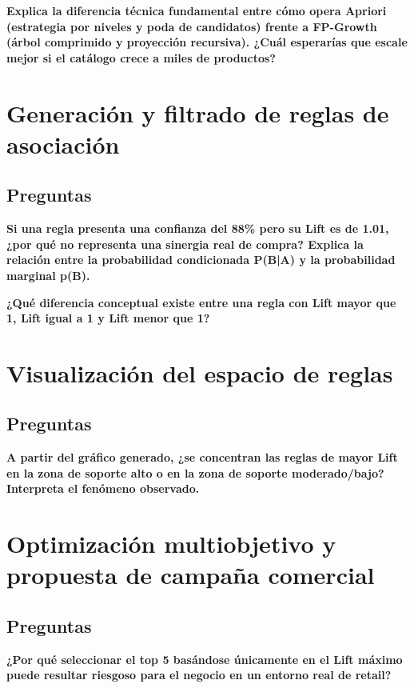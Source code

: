 \documentclass[letterpaper,11pt]{article}
\begin{document}
\textbf{Explica la diferencia técnica fundamental entre cómo opera Apriori (estrategia por niveles y poda
de candidatos) frente a FP-Growth (árbol comprimido y proyección recursiva). ¿Cuál esperarías
que escale mejor si el catálogo crece a miles de productos?}

\newpage

\section{Generación y filtrado de reglas de asociación}

\subsection{Preguntas}

\textbf{Si una regla presenta una confianza del 88\% pero su Lift es de 1.01, ¿por qué no representa una
sinergia real de compra? Explica la relación entre la probabilidad condicionada P(B|A) y la
probabilidad marginal p(B).}

\textbf{¿Qué diferencia conceptual existe entre una regla con  Lift mayor que 1, Lift igual a 1 y Lift menor que 1?}

\newpage

\section{Visualización del espacio de reglas}

\subsection{Preguntas}

\textbf{A partir del gráfico generado, ¿se concentran las reglas de mayor Lift en la zona de soporte alto o
en la zona de soporte moderado/bajo? Interpreta el fenómeno observado.}

\newpage
\section{Optimización multiobjetivo y propuesta de campaña comercial}

\subsection{Preguntas}

\textbf{¿Por qué seleccionar el top 5 basándose únicamente en el Lift máximo puede resultar riesgoso
para el negocio en un entorno real de retail?}
\end{document}
